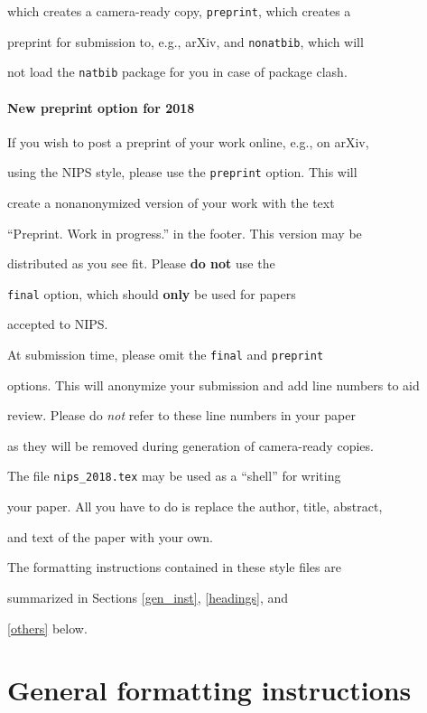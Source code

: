 \documentclass{article}
\begin{document}
which creates a camera-ready copy, \verb+preprint+, which creates a

preprint for submission to, e.g., arXiv, and \verb+nonatbib+, which will

not load the \verb+natbib+ package for you in case of package clash.



\paragraph{New preprint option for 2018}

If you wish to post a preprint of your work online, e.g., on arXiv,

using the NIPS style, please use the \verb+preprint+ option. This will

create a nonanonymized version of your work with the text

``Preprint. Work in progress.''  in the footer. This version may be

distributed as you see fit. Please \textbf{do not} use the

\verb+final+ option, which should \textbf{only} be used for papers

accepted to NIPS.



At submission time, please omit the \verb+final+ and \verb+preprint+

options. This will anonymize your submission and add line numbers to aid

review. Please do \emph{not} refer to these line numbers in your paper

as they will be removed during generation of camera-ready copies.



The file \verb+nips_2018.tex+ may be used as a ``shell'' for writing

your paper. All you have to do is replace the author, title, abstract,

and text of the paper with your own.



The formatting instructions contained in these style files are

summarized in Sections \ref{gen_inst}, \ref{headings}, and

\ref{others} below.



\section{General formatting instructions}
\end{document}

